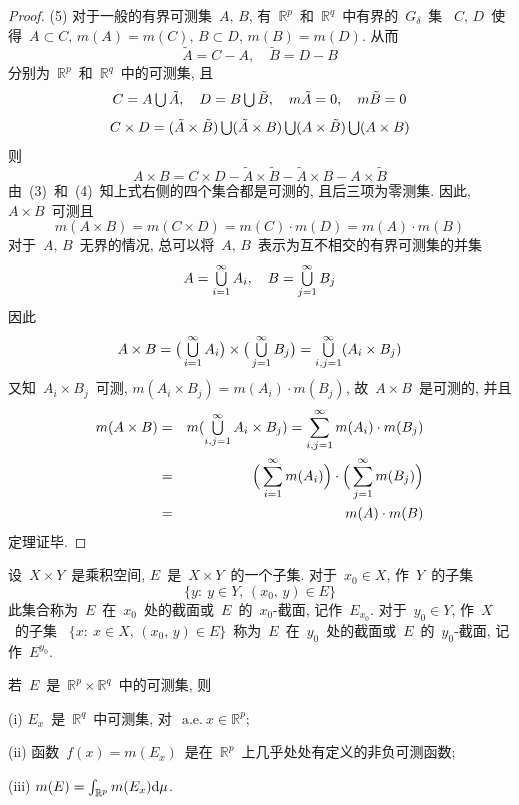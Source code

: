 \begin{proof}
(5) 对于一般的有界可测集~$A,\,  B$, 有~$\mathbb{R}^{p}$~和~$\mathbb{R}^{q}$~中有界的~$G_\delta$~集~
$C,\, D$~使得~$A\subset C, \, m(A)=m(C), \, B\subset D, \, m(B)=m(D)$. 从而
\[
\tilde{A}=C-A,\quad \tilde{B}=D-B
\]
分别为~$\mathbb{R}^{p}$~和~$\mathbb{R}^{q}$~中的可测集, 且
\[
C=A \mathop{\textstyle{\bigcup}} \tilde{A},\quad D=B \mathop{\textstyle{\bigcup}} \tilde{B}, \quad m \tilde{A}=0, \quad m \tilde{B}=0
\]
\[
C \times D=(\tilde{A} \times \tilde{B})\mathop{\textstyle{\bigcup}} (\tilde{ A}\times B)\mathop{\textstyle{\bigcup}}(A\times \tilde{B})\mathop{\textstyle{\bigcup}} (A\times B)
\]
则
\[
A \times B=C \times D-\tilde{A} \times \tilde{B}-\tilde{ A} \times B-A \times \tilde{B}
\]
由~(3)~和~(4)~知上式右侧的四个集合都是可测的, 且后三项为零测集. 因此, $A\times B$~可测且
\[
m(A\times B)=m(C\times D)=m(C)\cdot m(D)=m(A)\cdot m(B)
\]
对于~$A,\, B$~无界的情况, 总可以将~$A,\,  B$~表示为互不相交的有界可测集的并集
\[
A=\mathop{\textstyle{\bigcup}}\limits_{i=1}^{\infty}A_i,  \quad B=\mathop{\textstyle{\bigcup}}\limits_{j=1}^{\infty}B_j
\]
因此
\[
A \times B =\big(\mathop{\textstyle{\bigcup}}\limits_{i=1}^{\infty}A_i\big) \times \big(\mathop{\textstyle{\bigcup}}\limits_{j=1}^{\infty}B_j\big) = \mathop{\textstyle{\bigcup}}\limits_{i, j=1}^{\infty}(A_i \times B_j)
\]
又知~$A_i\times B_j$~可测, $m(A_i\times B_j)=m(A_i)\cdot m(B_j)$, 故~$A \times B$~是可测的, 并且
\begin{eqnarray*}
m(A\times B) &=& m(\mathop{\textstyle{\bigcup}}\limits_{i, j=1}^{\infty}A_i\times B_j)=\sum_{i, j=1}^{\infty}m (A_i)\cdot m (B_j) \\
&=&\Big(\sum_{i=1}^{\infty}m (A_i)\Big)\cdot\Big(\sum_{j=1}^{\infty}m (B_j)\Big) \\
&=& m(A)\cdot m(B)
\end{eqnarray*}
定理证毕.
\end{proof}

\begin{definition}
设~$X \times Y$~是乘积空间, $E$~是~$X \times Y$~的一个子集. 对于~$x_0 \in X$, 作~$Y$~的子集
\[
\{y:\: y\in Y,\,  (x_0,\, y)\in E\}
\]
此集合称为~$E$~在~$x_0$~处的截面或~$E$~的~$x_0$-截面, 记作~$E_{x_0}$. 对于~$y_0 \in Y$, 作~$X$~的子集
~$\{x:\: x\in X,\, (x_0,\, y)\in E\}$~称为~$E$~在~$y_0$~处的截面或~$E$~的~$y_0$-截面, 记作~$E^{y_0}$.
\end{definition}

\begin{theorem}\label{thm-5-2}
若~$E$~是~$\mathbb{R}^{p}\times \mathbb{R}^{q}$~中的可测集, 则

(i) $E_{x}$~是~$\mathbb{R}^{q}$~中可测集, 对~$\mathrm{~a.e.~} x\in \mathbb{R}^{p}$;

(ii) 函数~$f(x)=m(E_x)$~是在~$\mathbb{R}^{p}$~上几乎处处有定义的非负可测函数;

(iii) $m(E) =\int_{\mathbb{R}^{p}}m(E_{x}) \mathrm{d} \mu$.
\end{theorem}

